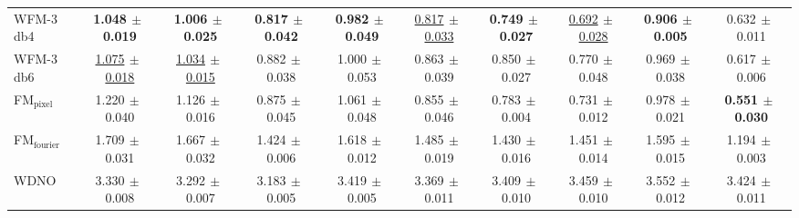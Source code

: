 \begin{table}[ht]
{\begin{tabular}{lccccccccc}
WFM-3 db4 & \textbf{1.048{\scriptsize$\,\pm\,$0.019}} & \textbf{1.006{\scriptsize$\,\pm\,$0.025}} & \textbf{0.817{\scriptsize$\,\pm\,$0.042}} & \textbf{0.982{\scriptsize$\,\pm\,$0.049}} & \underline{0.817{\scriptsize$\,\pm\,$0.033}} & \textbf{0.749{\scriptsize$\,\pm\,$0.027}} & \underline{0.692{\scriptsize$\,\pm\,$0.028}} & \textbf{0.906{\scriptsize$\,\pm\,$0.005}} & 0.632{\scriptsize$\,\pm\,$0.011} \\
WFM-3 db6 & \underline{1.075{\scriptsize$\,\pm\,$0.018}} & \underline{1.034{\scriptsize$\,\pm\,$0.015}} & 0.882{\scriptsize$\,\pm\,$0.038} & 1.000{\scriptsize$\,\pm\,$0.053} & 0.863{\scriptsize$\,\pm\,$0.039} & 0.850{\scriptsize$\,\pm\,$0.027} & 0.770{\scriptsize$\,\pm\,$0.048} & 0.969{\scriptsize$\,\pm\,$0.038} & 0.617{\scriptsize$\,\pm\,$0.006} \\
\midrule
FM$_\text{pixel}$ & 1.220{\scriptsize$\,\pm\,$0.040} & 1.126{\scriptsize$\,\pm\,$0.016} & 0.875{\scriptsize$\,\pm\,$0.045} & 1.061{\scriptsize$\,\pm\,$0.048} & 0.855{\scriptsize$\,\pm\,$0.046} & 0.783{\scriptsize$\,\pm\,$0.004} & 0.731{\scriptsize$\,\pm\,$0.012} & 0.978{\scriptsize$\,\pm\,$0.021} & \textbf{0.551{\scriptsize$\,\pm\,$0.030}} \\
FM$_\text{fourier}$ & 1.709{\scriptsize$\,\pm\,$0.031} & 1.667{\scriptsize$\,\pm\,$0.032} & 1.424{\scriptsize$\,\pm\,$0.006} & 1.618{\scriptsize$\,\pm\,$0.012} & 1.485{\scriptsize$\,\pm\,$0.019} & 1.430{\scriptsize$\,\pm\,$0.016} & 1.451{\scriptsize$\,\pm\,$0.014} & 1.595{\scriptsize$\,\pm\,$0.015} & 1.194{\scriptsize$\,\pm\,$0.003} \\
WDNO & 3.330{\scriptsize$\,\pm\,$0.008} & 3.292{\scriptsize$\,\pm\,$0.007} & 3.183{\scriptsize$\,\pm\,$0.005} & 3.419{\scriptsize$\,\pm\,$0.005} & 3.369{\scriptsize$\,\pm\,$0.011} & 3.409{\scriptsize$\,\pm\,$0.010} & 3.459{\scriptsize$\,\pm\,$0.010} & 3.552{\scriptsize$\,\pm\,$0.012} & 3.424{\scriptsize$\,\pm\,$0.011} \\
\bottomrule
\end{tabular}
}
\end{table}
